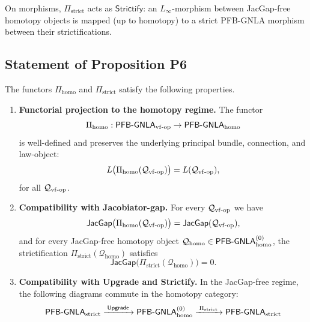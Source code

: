 \documentclass[11pt]{book}
\theoremstyle{plain}
\theoremstyle{definition}
\begin{document}
On morphisms, \(\Pi_{\mathrm{strict}}\) acts as
\(\mathsf{Strictify}\): an \(L_\infty\)-morphism between JacGap-free
homotopy objects is mapped (up to homotopy) to a strict PFB-GNLA
morphism between their strictifications.



\subsection*{Statement of Proposition P6}


\begin{proposition}
\label{prop:P6-projection}
The functors \(\Pi_{\mathrm{homo}}\) and \(\Pi_{\mathrm{strict}}\)
satisfy the following properties.

\begin{enumerate}
  \item[\textnormal{(1)}] \textbf{Functorial projection to the homotopy
        regime.}
    The functor
    \[
      \Pi_{\mathrm{homo}} :
      \mathsf{PFB\text- GNLA}_{\mathrm{vf\text- op}}
      \to
      \mathsf{PFB\text- GNLA}_{\mathrm{homo}}
    \]
    is well-defined and preserves the underlying principal bundle,
    connection, and law-object:
    \[
      L\bigl(\Pi_{\mathrm{homo}}(\mathcal{Q}_{\mathrm{vf\text- op}})\bigr)
      =
      L(\mathcal{Q}_{\mathrm{vf\text- op}}),
    \]
    for all \(\mathcal{Q}_{\mathrm{vf\text- op}}\).
  \item[\textnormal{(2)}] \textbf{Compatibility with Jacobiator-gap.}
    For every \(\mathcal{Q}_{\mathrm{vf\text- op}}\) we have
    \[
      \mathsf{JacGap}\bigl(
        \Pi_{\mathrm{homo}}(\mathcal{Q}_{\mathrm{vf\text- op}})
      \bigr)
      =
      \mathsf{JacGap}(\mathcal{Q}_{\mathrm{vf\text- op}}),
    \]
    and for every JacGap-free homotopy object
    \(\mathcal{Q}_{\mathrm{homo}}\in
     \mathsf{PFB\text- GNLA}_{\mathrm{homo}}^{(0)}\),
    the strictification \(\Pi_{\mathrm{strict}}(\mathcal{Q}_{\mathrm{homo}})\)
    satisfies
    \[
      \mathsf{JacGap}\bigl(
        \Pi_{\mathrm{strict}}(\mathcal{Q}_{\mathrm{homo}})
      \bigr)
      = 0.
    \]
  \item[\textnormal{(3)}] \textbf{Compatibility with Upgrade and
        Strictify.}
    In the JacGap-free regime, the following diagrams commute in the
    homotopy category:
    \[
      \mathsf{PFB\text- GNLA}_{\mathrm{strict}}
      \xrightarrow{\;\mathsf{Upgrade}\;}
      \mathsf{PFB\text- GNLA}_{\mathrm{homo}}^{(0)}
      \xrightarrow{\;\Pi_{\mathrm{strict}}\;}
      \mathsf{PFB\text- GNLA}_{\mathrm{strict}}
\]
\end{enumerate}
\end{proposition}
\end{document}
